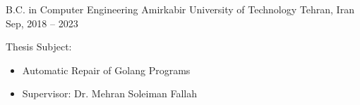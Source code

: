

\begin{cventries}

  \cventry 
    {B.C. in Computer Engineering} %
    {Amirkabir University of Technology} %
    {Tehran, Iran} %
    {Sep, 2018 – 2023} %
    {
        \begin{cvitems}
        \item {Thesis Subject:}
        \begin{itemize}
        \item {Automatic Repair of Golang Programs}
        \item {Supervisor: Dr. Mehran Soleiman Fallah}
        \end{itemize}
        \end{cvitems}
    }

\end{cventries}

